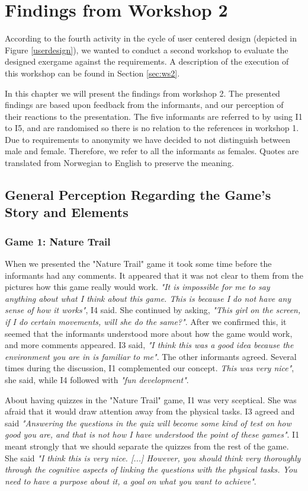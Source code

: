 \chapter{Findings from Workshop 2}
\label{chap:findW2}

According to the fourth activity in the cycle of user centered design (depicted in Figure \ref{userdesign}), we wanted to conduct a second workshop to evaluate the designed exergame against the requirements. A description of the execution of this workshop can be found in Section \ref{sec:ws2}. 

In this chapter we will present the findings from workshop 2. The presented findings are based upon feedback from the informants, and our perception of their reactions to the presentation. The five informants are referred to by using I1 to I5, and are randomised so there is no relation to the references in workshop 1. Due to requirements to anonymity we have decided to not distinguish between male and female. Therefore, we refer to all the informants as females. Quotes are translated from Norwegian to English to  preserve the meaning. 

\section{General Perception Regarding the Game's Story and Elements}

\subsection{Game 1: Nature Trail}

When we presented the "Nature Trail" game it took some time before the informants had any comments. It appeared that it was not clear to them from the pictures how this game really would work. \emph{"It is impossible for me to say anything about what I think about this game. This is because I do not have any sense of how it works"}, I4 said. She continued by asking, \emph{"This girl on the screen, if I do certain movements, will she do the same?"}. After we confirmed this, it seemed that the informants understood more about how the game would work, and more comments appeared. I3 said, \emph{"I think this was a good idea because the environment you are in is familiar to me"}. The other informants agreed. Several times during the discussion, I1 complemented our concept. \emph{This was very nice"}, she said, while I4 followed with \emph{"fun development"}.  

About having quizzes in the "Nature Trail" game, I1 was very sceptical. She was afraid that it would draw attention away from the physical tasks. I3 agreed and said \emph{"Answering the questions in the quiz will become some kind of test on how good you are, and that is not how I have understood the point of these games"}. I1 meant strongly that we should separate the quizzes from the rest of the game. She said \emph{"I think this is very nice. [...] However, you should think very thoroughly through the cognitive aspects of linking the questions with the physical tasks. You need to have a purpose about it, a goal on what you want to achieve"}. 

